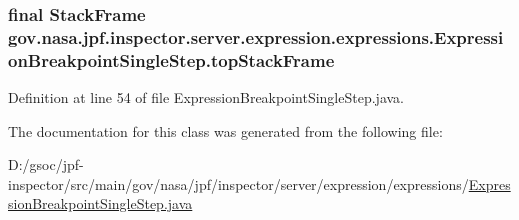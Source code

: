 \subsubsection[{\texorpdfstring{top\+Stack\+Frame}{topStackFrame}}]{\setlength{\rightskip}{0pt plus 5cm}final Stack\+Frame gov.\+nasa.\+jpf.\+inspector.\+server.\+expression.\+expressions.\+Expression\+Breakpoint\+Single\+Step.\+top\+Stack\+Frame\hspace{0.3cm}{\ttfamily [private]}}\hypertarget{classgov_1_1nasa_1_1jpf_1_1inspector_1_1server_1_1expression_1_1expressions_1_1_expression_breakpoint_single_step_afa7515e97496d50357b868ae93eb4023}{}\label{classgov_1_1nasa_1_1jpf_1_1inspector_1_1server_1_1expression_1_1expressions_1_1_expression_breakpoint_single_step_afa7515e97496d50357b868ae93eb4023}


Definition at line 54 of file Expression\+Breakpoint\+Single\+Step.\+java.



The documentation for this class was generated from the following file\+:\begin{DoxyCompactItemize}
\item 
D\+:/gsoc/jpf-\/inspector/src/main/gov/nasa/jpf/inspector/server/expression/expressions/\hyperlink{_expression_breakpoint_single_step_8java}{Expression\+Breakpoint\+Single\+Step.\+java}\end{DoxyCompactItemize}
